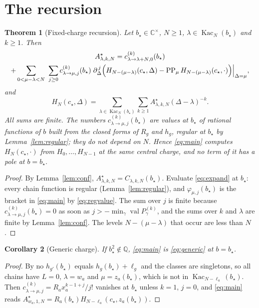 \documentclass[11pt]{article}
\newtheorem{theorem}{Theorem}
\newtheorem{corollary}[theorem]{Corollary}
\theoremstyle{definition}
\theoremstyle{remark}
\newcommand{\PP}{\operatorname{PP}}
\newcommand{\Kac}{\operatorname{Kac}}
\begin{document}
\section{The recursion}

\begin{theorem}[Fixed-charge recursion]\label{thm:main}
Let $b_\star\in\mathbb C^\times$, $N\ge1$, $\lambda\in\Kac_N(b_\star)$ and $k\ge1$.
Then
\begin{multline}\label{eq:main}
 A^\star_{\lambda,k,N}
 =c^{(k)}_{\lambda\to\lambda+N,0}(b_\star)\\
 +\sum_{0<\mu-\lambda<N}\ \sum_{j\ge0}c^{(k)}_{\lambda\to\mu,j}(b_\star)\;
 \partial_\Delta^{\,j}\Bigl(H_{N-(\mu-\lambda)}(c_\star,\Delta)
 -\PP_\mu H_{N-(\mu-\lambda)}(c_\star,\cdot)\Bigr)\Big|_{\Delta=\mu},
\end{multline}
and
\[
 H_N(c_\star,\Delta)=\sum_{\lambda\in\Kac_N(b_\star)}\sum_{k\ge1}
 A^\star_{\lambda,k,N}(\Delta-\lambda)^{-k}.
\]
All sums are finite.  The numbers
$c^{(k)}_{\lambda\to\mu,j}(b_\star)$ are values at $b_\star$ of rational
functions of $b$ built from the closed forms of $R_g$ and $h_g$, regular at
$b_\star$ by Lemma~\ref{lem:regular}; they do not depend on $N$.  Hence
\eqref{eq:main} computes $H_N(c_\star,\cdot)$ from $H_0,\dots,H_{N-1}$ at the
same central charge, and no term of it has a pole at $b=b_\star$.
\end{theorem}

\begin{proof}
By Lemma~\ref{lem:conf}, $A^\star_{\lambda,k,N}=C_{\lambda,k,N}(b_\star)$.
Evaluate \eqref{eq:expand} at $b_\star$: every chain function is regular
(Lemma~\ref{lem:regular}), and
$\varphi_{\mu,j}(b_\star)$ is the bracket in \eqref{eq:main} by
\eqref{eq:regvalue}.  The sum over $j$ is finite because
$c^{(k)}_{\lambda\to\mu,j}(b_\star)=0$ as soon as
$j>-\min_\gamma\operatorname{val}P^{(k)}_\gamma$, and the sums over $k$ and
$\lambda$ are finite by Lemma~\ref{lem:conf}.  The levels
$N-(\mu-\lambda)$ that occur are less than $N$.
\end{proof}

\begin{corollary}[Generic charge]\label{cor:generic}
If $b_\star^2\notin\mathbb Q$, \eqref{eq:main} is \eqref{eq:generic} at
$b=b_\star$.
\end{corollary}

\begin{proof}
By \cite[Lemma~6.3]{CP} no $h_{g'}(b_\star)$ equals $h_g(b_\star)+\ell_g$ and
the classes are singletons, so all chains have $L=0$, $\lambda=w_a$ and
$\mu=z_a(b_\star)$, which is not in $\Kac_{N-\ell_a}(b_\star)$.  Then
$c^{(k)}_{\lambda\to\mu,j}=R_ax_a^{k-1+j}/j!$ vanishes at $b_\star$ unless
$k=1$, $j=0$, and \eqref{eq:main} reads
$A^\star_{w_a,1,N}=R_a(b_\star)H_{N-\ell_a}(c_\star,z_a(b_\star))$.
\end{proof}
\end{document}
